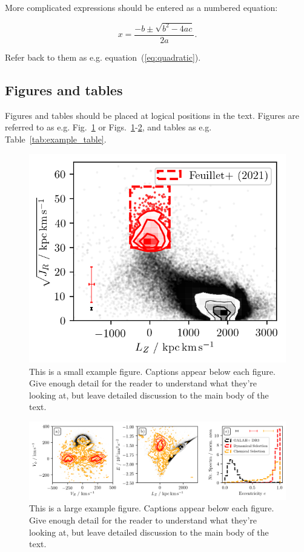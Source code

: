 \documentclass[fleqn,usenatbib]{mnras}
\begin{document}
More complicated expressions should be entered as a numbered equation:

\begin{equation}
    x=\frac{-b\pm\sqrt{b^2-4ac}}{2a}.
	\label{eq:quadratic}
\end{equation}

Refer back to them as e.g. equation~(\ref{eq:quadratic}).

\subsection{Figures and tables}

Figures and tables should be placed at logical positions in the text. Figures are referred to as e.g. Fig.~\ref{fig:example_figure_small} or Figs.~\ref{fig:example_figure_small}-\ref{fig:example_figure_large}, and tables as e.g. Table~\ref{tab:example_table}.

\begin{figure}
	\includegraphics[width=\columnwidth]{figures/placeholder_columnwidth.png}
    \caption{This is a small example figure. Captions appear below each figure.
	Give enough detail for the reader to understand what they're looking at,
	but leave detailed discussion to the main body of the text.}
    \label{fig:example_figure_small}
\end{figure}

\begin{figure}
	\includegraphics[width=\textwidth]{figures/placeholder_textwidth.png}
    \caption{This is a large example figure. Captions appear below each figure.
	Give enough detail for the reader to understand what they're looking at,
	but leave detailed discussion to the main body of the text.}
    \label{fig:example_figure_large}
\end{figure}
\end{document}
